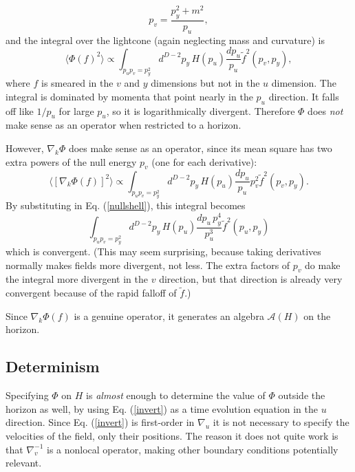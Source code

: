 \documentclass{article}
\begin{document}
\begin{equation}\label{nullshell}
p_v = \frac{p_y^2 + m^2}{p_u},
\end{equation}
and the integral over the lightcone (again neglecting mass and curvature) is
\begin{equation}\label{spectral}
\langle \Phi(f)^2 \rangle \propto
\int_{p_u p_v = p_y^2} d^{D-2}p_y\,H(p_u) \frac{dp_u}{p_u} \tilde{f}^2(p_v, p_y),
\end{equation}
where $f$ is smeared in the $v$ and $y$ dimensions but not in the $u$ dimension.  The integral is dominated by momenta that point nearly in the $p_u$ direction.  It falls off like $1/p_u$ for large $p_u$, so it is logarithmically divergent.  Therefore $\Phi$ does \emph{not} make sense as an operator when restricted to a horizon.

However, $\nabla_k \Phi$ does make sense as an operator, since its mean square has two extra powers of the null energy $p_v$ (one for each derivative):
\begin{equation}
\langle [\nabla_k \Phi(f)]^2 \rangle \propto
\int_{p_u p_v = p_y^2} d^{D-2}p_y\,H(p_u)\frac{dp_u}{p_u} p_v^2 \tilde{f}^2(p_v, p_y).
\end{equation}
By substituting in Eq. (\ref{nullshell}), this integral becomes
\begin{equation}
\int_{p_u p_v = p_y^2} d^{D-2}p_y\,H(p_u)\frac{dp_u\,p_y^4}{p_u^3} \tilde{f}^2(p_u, p_y)
\end{equation}
which is convergent.  (This may seem surprising, because taking derivatives normally makes fields more divergent, not less.  The extra factors of $p_v$ do make the integral more divergent in the $v$ direction, but that direction is already very convergent because of the rapid falloff of $\tilde{f}$.)

Since $\nabla_k \Phi(f)$ is a genuine operator, it generates an algebra $\mathcal{A}(H)$ on the horizon.

\subsection{Determinism}

Specifying $\Phi$ on $H$ is \emph{almost} enough to determine the value of $\Phi$ outside the horizon as well, by using Eq. (\ref{invert}) as a time evolution equation in the $u$ direction.  Since Eq. (\ref{invert}) is first-order in $\nabla_u$ it is not necessary to specify the velocities of the field, only their positions.  The reason it does not quite work is that $\nabla_v^{-1}$ is a nonlocal operator, making other boundary conditions potentially relevant.
\end{document}
